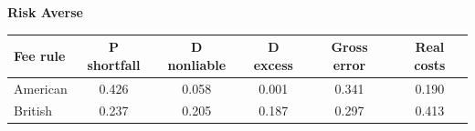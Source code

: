 \documentclass[10pt,border=5pt,varwidth=17cm]{standalone}
\begin{document}
\begingroup
\small
\setlength{\tabcolsep}{5pt}
\renewcommand{\arraystretch}{1.20}
\noindent\textbf{Risk Averse}\par\smallskip
\noindent\begin{tabularx}{\linewidth}{@{}>{\raggedright\arraybackslash}Xccccc@{}}
\toprule
\textbf{Fee rule} & \textbf{P shortfall} & \textbf{D nonliable} & \textbf{D excess} & \textbf{Gross error} & \textbf{Real costs} \\
\midrule
American & 0.426 & 0.058 & 0.001 & 0.341 & 0.190 \\
British & 0.237 & 0.205 & 0.187 & 0.297 & 0.413 \\
\bottomrule\end{tabularx}\par\medskip
\endgroup
\end{document}
